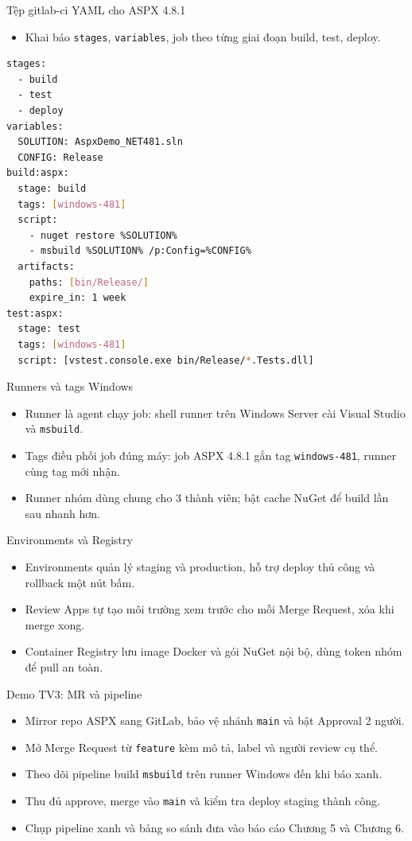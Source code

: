 \begin{frame}[fragile]{Tệp gitlab-ci YAML cho ASPX 4.8.1}
\begin{itemize}
\item Khai báo \texttt{stages}, \texttt{variables}, job theo từng giai đoạn build, test, deploy.
\end{itemize}
\begin{lstlisting}[language=bash]
stages:
  - build
  - test
  - deploy
variables:
  SOLUTION: AspxDemo_NET481.sln
  CONFIG: Release
build:aspx:
  stage: build
  tags: [windows-481]
  script:
    - nuget restore %SOLUTION%
    - msbuild %SOLUTION% /p:Config=%CONFIG%
  artifacts:
    paths: [bin/Release/]
    expire_in: 1 week
test:aspx:
  stage: test
  tags: [windows-481]
  script: [vstest.console.exe bin/Release/*.Tests.dll]
\end{lstlisting}
\end{frame}

\begin{frame}{Runners và tags Windows}
\begin{itemize}
\item Runner là agent chạy job: shell runner trên Windows Server cài Visual Studio và \texttt{msbuild}.
\item Tags điều phối job đúng máy: job ASPX 4.8.1 gắn tag \texttt{windows-481}, runner cùng tag mới nhận.
\item Runner nhóm dùng chung cho 3 thành viên; bật cache NuGet để build lần sau nhanh hơn.
\end{itemize}
\end{frame}

\begin{frame}{Environments và Registry}
\begin{itemize}
\item Environments quản lý staging và production, hỗ trợ deploy thủ công và rollback một nút bấm.
\item Review Apps tự tạo môi trường xem trước cho mỗi Merge Request, xóa khi merge xong.
\item Container Registry lưu image Docker và gói NuGet nội bộ, dùng token nhóm để pull an toàn.
\end{itemize}
\end{frame}

\begin{frame}{Demo TV3: MR và pipeline}
\begin{itemize}
\item[$\square$] Mirror repo ASPX sang GitLab, bảo vệ nhánh \texttt{main} và bật Approval 2 người.
\item[$\square$] Mở Merge Request từ \texttt{feature} kèm mô tả, label và người review cụ thể.
\item[$\square$] Theo dõi pipeline build \texttt{msbuild} trên runner Windows đến khi báo xanh.
\item[$\square$] Thu đủ approve, merge vào \texttt{main} và kiểm tra deploy staging thành công.
\item[$\square$] Chụp pipeline xanh và bảng so sánh đưa vào báo cáo Chương 5 và Chương 6.
\end{itemize}
\end{frame}
